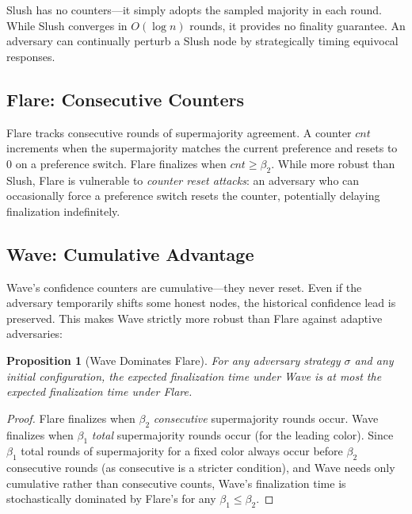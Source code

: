 \documentclass[11pt,a4paper]{article}
\newtheorem{proposition}[theorem]{Proposition}
\begin{document}
Slush has no counters---it simply adopts the sampled majority in each round. While Slush
converges in $O(\log n)$ rounds, it provides no finality guarantee. An adversary can
continually perturb a Slush node by strategically timing equivocal responses.

\subsection{Flare: Consecutive Counters}

Flare tracks consecutive rounds of supermajority agreement. A counter $cnt$ increments
when the supermajority matches the current preference and resets to 0 on a preference
switch. Flare finalizes when $cnt \geq \beta_2$. While more robust than Slush, Flare
is vulnerable to \emph{counter reset attacks}: an adversary who can occasionally force
a preference switch resets the counter, potentially delaying finalization indefinitely.

\subsection{Wave: Cumulative Advantage}

Wave's confidence counters are cumulative---they never reset. Even if the adversary
temporarily shifts some honest nodes, the historical confidence lead is preserved.
This makes Wave strictly more robust than Flare against adaptive adversaries:

\begin{proposition}[Wave Dominates Flare]
\label{prop:dominance}
For any adversary strategy $\sigma$ and any initial configuration, the expected
finalization time under Wave is at most the expected finalization time under Flare.
\end{proposition}

\begin{proof}
Flare finalizes when $\beta_2$ \emph{consecutive} supermajority rounds occur. Wave
finalizes when $\beta_1$ \emph{total} supermajority rounds occur (for the leading color).
Since $\beta_1$ total rounds of supermajority for a fixed color always occur before
$\beta_2$ consecutive rounds (as consecutive is a stricter condition), and Wave needs
only cumulative rather than consecutive counts, Wave's finalization time is stochastically
dominated by Flare's for any $\beta_1 \leq \beta_2$.
\end{proof}

\end{document}
